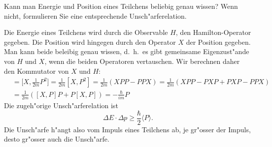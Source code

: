 Kann man Energie und Position eines Teilchens beliebig genau wissen?
Wenn nicht, formulieren Sie eine entsprechende Unsch"arferelation.

\begin{loesung}
Die Energie eines Teilchens wird durch die Observable $H$, den
Hamilton-Operator gegeben.
Die Position wird hingegen durch den Operator $X$ der Position
gegeben.
Man kann beide beleibig genau wissen, d.~h.~es gibt gemeinsame
Eigenzust"ande von $H$ und $X$, wenn die beiden Operatoren vertauschen.
Wir berechnen daher den Kommutator von $X$ und $H$:
\begin{align*}
[X,H]
&=
\biggl[X,\frac1{2m}P^2\biggr]
=
\frac1{2m}[X,P^2]
=
\frac1{2m}(XPP-PPX)
=
\frac1{2m}(XPP-PXP+PXP-PPX)
\\
&=
\frac1{2m}([X,P]P+P[X,P])
=
-\frac{\hbar}{im} P
\end{align*}
Die zugeh"orige Unsch"arferelation ist
\[
\Delta E\cdot \Delta p\ge \frac{\hbar}{2}\langle P\rangle.
\]
Die Unsch"arfe h"angt also vom Impuls eines Teilchens ab, je gr"osser
der Impuls, desto gr"osser auch die Unsch"arfe.
\end{loesung}

